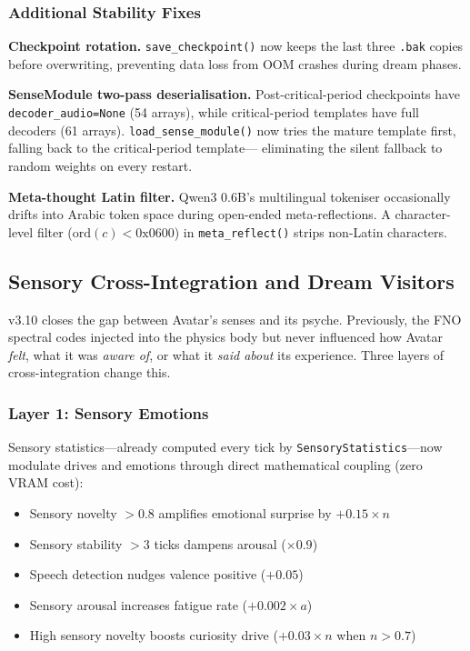 \subsubsection{Additional Stability Fixes}

\textbf{Checkpoint rotation.} \texttt{save\_checkpoint()} now keeps the last
three \texttt{.bak} copies before overwriting, preventing data loss from OOM
crashes during dream phases.

\textbf{SenseModule two-pass deserialisation.} Post-critical-period checkpoints
have \texttt{decoder\_audio=None} (54 arrays), while critical-period templates
have full decoders (61 arrays). \texttt{load\_sense\_module()} now tries the
mature template first, falling back to the critical-period template---
eliminating the silent fallback to random weights on every restart.

\textbf{Meta-thought Latin filter.} Qwen3 0.6B's multilingual tokeniser
occasionally drifts into Arabic token space during open-ended meta-reflections.
A character-level filter ($\text{ord}(c) < \text{0x0600}$) in
\texttt{meta\_reflect()} strips non-Latin characters.

\subsection{Sensory Cross-Integration and Dream Visitors}
\label{sec:v310}

v3.10 closes the gap between Avatar's senses and its psyche. Previously, the
FNO spectral codes injected into the physics body but never influenced how
Avatar \emph{felt}, what it was \emph{aware of}, or what it \emph{said about}
its experience. Three layers of cross-integration change this.

\subsubsection{Layer 1: Sensory Emotions}

Sensory statistics---already computed every tick by
\texttt{SensoryStatistics}---now modulate drives and emotions through direct
mathematical coupling (zero VRAM cost):
\begin{itemize}
  \item Sensory novelty $> 0.8$ amplifies emotional surprise by $+0.15 \times n$
  \item Sensory stability $> 3$ ticks dampens arousal ($\times 0.9$)
  \item Speech detection nudges valence positive ($+0.05$)
  \item Sensory arousal increases fatigue rate ($+0.002 \times a$)
  \item High sensory novelty boosts curiosity drive ($+0.03 \times n$ when $n > 0.7$)
\end{itemize}

